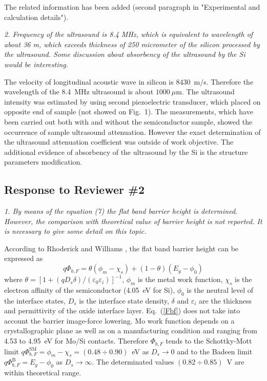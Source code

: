 \documentclass[aip,jap,preprint]{revtex4-1}
\begin{document}
The related information has been added (second paragraph in "Experimental and calculation details").

\vspace{1cm}
\emph{2. Frequency of the ultrasound is 8.4 MHz, which is equivalent to wavelength of about 36 m, which exceeds thickness of 250 micrometer of the silicon processed by the ultrasound. Some discussion about absorbency of the ultrasound by the Si would be interesting.}

The velocity of longitudinal acoustic wave in silicon is $8430$~m$/$s.\cite{Cheeke}
Therefore the wavelength of the 8.4~MHz ultrasound is about $1000~\mu$m.
The ultrasound intensity was estimated by using second piezoelectric transducer, which placed on opposite end of sample (not showed on Fig.~1).
The measurements, which have been carried out both with and without the semiconductor sample, showed the occurrence of sample ultrasound attenuation.
However the exact determination of the ultrasound attenuation coefficient was outside of work objective.
The additional evidence of absorbency of the ultrasound by the Si is the structure parameters modification.


\subsection*{Response to Reviewer \#2}

\emph{1. By means of the equation (7) the flat band barrier height is determined. However, the comparison with theoretical value of barrier height is not reported. It is necessary to give some detail on this topic.}

According to Rhoderick and Williams \cite{Rhoderick1988}, the flat band barrier height can be expressed as
\begin{equation}
\label{Fbf}
    q\Phi_{b,F}=\theta(\phi_m-\chi_s)+(1-\theta)(E_g-\phi_0)
\end{equation}
where $\theta=[1+(qD_s\delta)/(\varepsilon_0\varepsilon_i)]^{-1}$, $\phi_m$ is the metal  work  function, $\chi_s$ is  the  electron  affinity of  the  semiconductor (4.05~eV for Si), $\phi_0$ is the neutral  level  of  the interface  states, $D_s$  is  the  interface  state  density, $\delta$ and $\varepsilon_i$ are the thickness and permittivity of the oxide interface  layer.
Eq.~(\ref{Fbf}) does not take into account the barrier image-force lowering.
Mo work function depends on a crystallographic plane as well as on a manufacturing condition  and ranging from 4.53 to 4.95~eV for Mo/Si contacts.\cite{MoWF2001,MoWF2002}
Therefore $\Phi_{b,F}$ tends to the Schottky-Mott limit $q\Phi_{b,F}^{\text{SM}}=\phi_m-\chi_s=(0.48\div0.90)$~eV as $D_s\rightarrow0$ and to the Badeen limit $q\Phi_{b,F}^{\text{B}}=E_g-\phi_0$ as $D_s\rightarrow\infty$.
The determinated values $(0.82\div0.85)$~V are within theoretical range.
\end{document}
